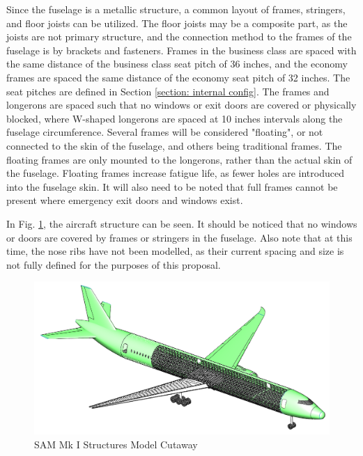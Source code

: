 Since the fuselage is a metallic structure, a common layout of frames, stringers, and floor joists can be utilized. The floor joists may be a composite part, as the joists are not primary structure, and the connection method to the frames of the fuselage is by brackets and fasteners. Frames in the business class are spaced with the same distance of the business class seat pitch of 36 inches, and the economy frames are spaced the same distance of the economy seat pitch of 32 inches. The seat pitches are defined in Section \ref{section: internal config}. The frames and longerons are spaced such that no windows or exit doors are covered or physically blocked, where W-shaped longerons are spaced at 10 inches intervals along the fuselage circumference. Several frames will be considered "floating", or not connected to the skin of the fuselage, and others being traditional frames. The floating frames are only mounted to the longerons, rather than the actual skin of the fuselage. Floating frames increase fatigue life, as fewer holes are introduced into the fuselage skin. It will also need to be noted that full frames cannot be present where emergency exit doors and windows exist.

In Fig. \ref{fig:structure_cutaway}, the aircraft structure can be seen. It should be noticed that no windows or doors are covered by frames or stringers in the fuselage. Also note that at this time, the nose ribs have not been modelled, as their current spacing and size is not fully defined for the purposes of this proposal.

\begin{figure}[!h]
    \centering
    \includegraphics[width=\linewidth]{Photos/structuresandloads/Updated Structures Cutaway.PNG}
    \caption{SAM Mk I Structures Model Cutaway}
    \label{fig:structure_cutaway}
\end{figure}

